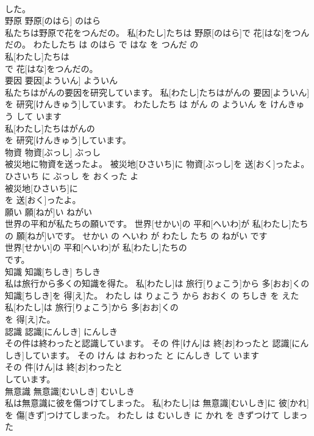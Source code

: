 \documentclass[8pt]{extreport}
\begin{document}
\begin{CJK}{UTF8}{min}
\\	した。			
\\	野原	野原[のはら]	のはら	
\\	私たちは野原で花をつんだの。	私[わたし]たちは 野原[のはら]で 花[はな]をつんだの。	わたしたち は のはら で はな を つんだ の	
\\	私[わたし]たちは
\\	で 花[はな]をつんだの。			
\\	要因	要因[よういん]	よういん	
\\	私たちはがんの要因を研究しています。	私[わたし]たちはがんの 要因[よういん]を 研究[けんきゅう]しています。	わたしたち は がん の よういん を けんきゅう して います	
\\	私[わたし]たちはがんの
\\	を 研究[けんきゅう]しています。			
\\	物資	物資[ぶっし]	ぶっし	
\\	被災地に物資を送ったよ。	被災地[ひさいち]に 物資[ぶっし]を 送[おく]ったよ。	ひさいち に ぶっし を おくった よ	
\\	被災地[ひさいち]に
\\	を 送[おく]ったよ。			
\\	願い	願[ねが]い	ねがい	
\\	世界の平和が私たちの願いです。	世界[せかい]の 平和[へいわ]が 私[わたし]たちの 願[ねが]いです。	せかい の へいわ が わたし たち の ねがい です	
\\	世界[せかい]の 平和[へいわ]が 私[わたし]たちの
\\	です。			
\\	知識	知識[ちしき]	ちしき	
\\	私は旅行から多くの知識を得た。	私[わたし]は 旅行[りょこう]から 多[おお]くの 知識[ちしき]を 得[え]た。	わたし は りょこう から おおく の ちしき を えた	
\\	私[わたし]は 旅行[りょこう]から 多[おお]くの
\\	を 得[え]た。			
\\	認識	認識[にんしき]	にんしき	
\\	その件は終わったと認識しています。	その 件[けん]は 終[お]わったと 認識[にんしき]しています。	その けん は おわった と にんしき して います	
\\	その 件[けん]は 終[お]わったと
\\	しています。			
\\	無意識	無意識[むいしき]	むいしき	
\\	私は無意識に彼を傷つけてしまった。	私[わたし]は 無意識[むいしき]に 彼[かれ]を 傷[きず]つけてしまった。	わたし は むいしき に かれ を きずつけて しまった	

\end{CJK}
\end{document}
